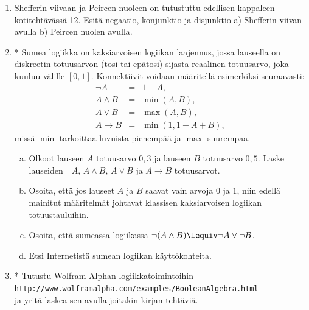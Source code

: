 \begin{enumerate}
\item Shefferin viivaan ja Peircen nuoleen on tutustuttu
edellisen kappaleen kotitehtävässä 12. Esitä negaatio,
konjunktio ja disjunktio a) Shefferin viivan avulla b)
Peircen nuolen avulla.

\newpage

\item *
Sumea logiikka on kaksiarvoisen logiikan
laajennus, jossa lauseella on diskreetin totuusarvon
(tosi tai epätosi) sijasta reaalinen totuusarvo, joka
kuuluu välille $[0, 1]$. Konnektiivit voidaan määritellä
esimerkiksi seuraavasti:
\[
\begin{array}{rcl}
\lnot A &=& 1-A,\\
A\land B &=& \min(A, B),\\
A\lor B &=& \max(A, B),\\
A\to B
&=& \min(1, 1-A+B),
\end{array}
\]
missä $\min$ tarkoittaa luvuista pienempää ja $\max$
suurempaa.

\begin{enumerate}[a)]
\item Olkoot lauseen $A$ totuusarvo $0,3$ ja lauseen
$B$ totuusarvo $0,5$. Laske lauseiden $\lnot A$, $A\land
B$, $A\lor B$ ja $A \to B$ totuusarvot.
\item Osoita, että jos lauseet $A$ ja $B$ saavat
vain arvoja $0$ ja $1$, niin edellä mainitut määritelmät johtavat
klassisen kaksiarvoisen logiikan totuustauluihin.
\item Osoita, että sumeassa logiikassa $\lnot(A\land B)
\lequiv \lnot A \lor \lnot B$.
\item Etsi Internetistä sumean logiikan
käyttökohteita.
\end{enumerate}

\item *
Tutustu Wolfram Alphan
logiikkatoimintoihin\\
\href{http://www.wolframalpha.com/examples/BooleanAlgebra.html}{{\tt http://www.wolframalpha.com/examples/BooleanAlgebra.html}}\\
ja yritä laskea sen avulla joitakin kirjan tehtäviä.


\end{enumerate}
